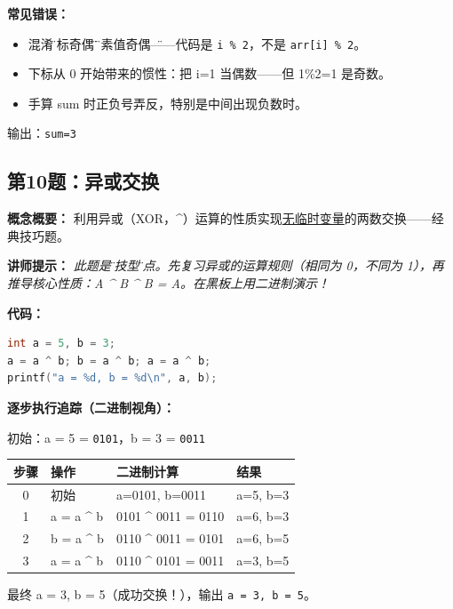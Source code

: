 \textbf{常见错误：}
\begin{itemize}
    \item 混淆\"下标奇偶\"和\"元素值奇偶\"——代码是 \texttt{i \% 2}，不是 \texttt{arr[i] \% 2}。
    \item 下标从 0 开始带来的惯性：把 i=1 当偶数——但 1\%2=1 是奇数。
    \item 手算 sum 时正负号弄反，特别是中间出现负数时。
\end{itemize}

{\color{highlight}输出：\texttt{sum=3}}

\subsection{第10题：异或交换}

\textbf{概念概要：} 利用异或（XOR，\^{}）运算的性质实现\underline{无临时变量}的两数交换——经典技巧题。

\medskip
\textbf{讲师提示：} \textit{此题是\"炫技型\"考点。先复习异或的运算规则（相同为 0，不同为 1），再推导核心性质：A \^{} B \^{} B = A。在黑板上用二进制演示！}

\smallskip
\textbf{代码：}
\begin{lstlisting}[language=C]
int a = 5, b = 3;
a = a ^ b; b = a ^ b; a = a ^ b;
printf("a = %d, b = %d\n", a, b);
\end{lstlisting}

\smallskip
\textbf{逐步执行追踪（二进制视角）：}

\noindent 初始：a = 5 = \texttt{0101}，b = 3 = \texttt{0011}

\begin{center}
\begin{tabular}{c|l|l|l}
\hline
\textbf{步骤} & \textbf{操作} & \textbf{二进制计算} & \textbf{结果} \\
\hline
0 & 初始 & a=0101, b=0011 & a=5, b=3 \\
1 & a = a \^{} b & 0101 \^{} 0011 = 0110 & a=6, b=3 \\
2 & b = a \^{} b & 0110 \^{} 0011 = 0101 & a=6, b=5 \\
3 & a = a \^{} b & 0110 \^{} 0101 = 0011 & a=3, b=5 \\
\hline
\end{tabular}
\end{center}

\noindent 最终 a = 3, b = 5（成功交换！），输出 \texttt{a = 3, b = 5}。

